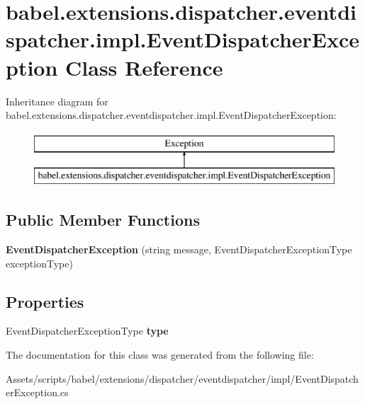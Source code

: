 \hypertarget{classbabel_1_1extensions_1_1dispatcher_1_1eventdispatcher_1_1impl_1_1_event_dispatcher_exception}{\section{babel.\-extensions.\-dispatcher.\-eventdispatcher.\-impl.\-Event\-Dispatcher\-Exception Class Reference}
\label{classbabel_1_1extensions_1_1dispatcher_1_1eventdispatcher_1_1impl_1_1_event_dispatcher_exception}
}
Inheritance diagram for babel.\-extensions.\-dispatcher.\-eventdispatcher.\-impl.\-Event\-Dispatcher\-Exception\-:\begin{figure}[H]
\begin{center}
\leavevmode
\includegraphics[height=2.000000cm]{classbabel_1_1extensions_1_1dispatcher_1_1eventdispatcher_1_1impl_1_1_event_dispatcher_exception}
\end{center}
\end{figure}
\subsection*{Public Member Functions}
\begin{DoxyCompactItemize}
\item 
\hypertarget{classbabel_1_1extensions_1_1dispatcher_1_1eventdispatcher_1_1impl_1_1_event_dispatcher_exception_ac0e7f116082deb24a4c4c85bf9bad54a}{{\bfseries Event\-Dispatcher\-Exception} (string message, Event\-Dispatcher\-Exception\-Type exception\-Type)}\label{classbabel_1_1extensions_1_1dispatcher_1_1eventdispatcher_1_1impl_1_1_event_dispatcher_exception_ac0e7f116082deb24a4c4c85bf9bad54a}

\end{DoxyCompactItemize}
\subsection*{Properties}
\begin{DoxyCompactItemize}
\item 
\hypertarget{classbabel_1_1extensions_1_1dispatcher_1_1eventdispatcher_1_1impl_1_1_event_dispatcher_exception_a02969a4f707ec1f9a47225144dcaf0e6}{Event\-Dispatcher\-Exception\-Type {\bfseries type}}\label{classbabel_1_1extensions_1_1dispatcher_1_1eventdispatcher_1_1impl_1_1_event_dispatcher_exception_a02969a4f707ec1f9a47225144dcaf0e6}

\end{DoxyCompactItemize}


The documentation for this class was generated from the following file\-:\begin{DoxyCompactItemize}
\item 
Assets/scripts/babel/extensions/dispatcher/eventdispatcher/impl/Event\-Dispatcher\-Exception.\-cs\end{DoxyCompactItemize}
